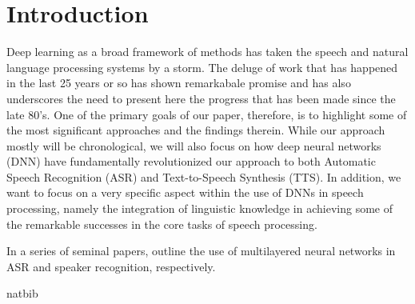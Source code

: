 \documentclass[12pt, titlepage, reqno]{article}
\begin{document}
\section{Introduction}
Deep learning as a broad framework of methods has taken the speech and natural language processing systems by a storm. The deluge of work that has happened in the last 25 years or so has shown remarkabale promise and has also underscores the need to present here the progress that has been made since the late 80's. One of the primary goals of our paper, therefore, is to highlight some of the most significant approaches and the findings therein. While our approach mostly will be chronological, we will also focus on how deep neural networks (DNN) have fundamentally revolutionized our approach to both Automatic Speech Recognition (ASR) and Text-to-Speech Synthesis (TTS). In addition, we want to focus on a very specific aspect within the use of DNNs in speech processing, namely the integration of linguistic knowledge in achieving some of the remarkable successes in the core tasks of speech processing.

In a series of seminal papers, \cite{bengio1989_acm,bengio1989} outline the use of multilayered neural networks in ASR and speaker recognition, respectively. 

 {natbib}

\end{document}

